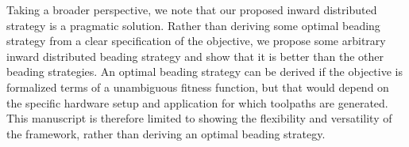 Taking a broader perspective, we note that our proposed inward distributed strategy is a pragmatic solution.
Rather than deriving some optimal beading strategy from a clear specification of the objective, we propose some arbitrary inward distributed beading strategy and show that it is better than the other beading strategies.
An optimal beading strategy can be derived if the objective is formalized terms of a unambiguous fitness function, but that would depend on the specific hardware setup and application for which toolpaths are generated.
This manuscript is therefore limited to showing the flexibility and versatility of the framework, rather than deriving an optimal beading strategy.




